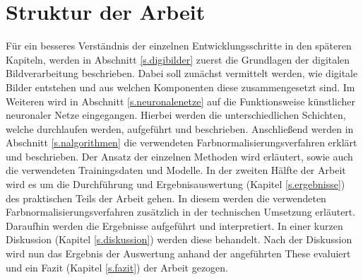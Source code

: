   \section{Struktur der Arbeit}\label{Struktur} 
Für ein besseres Verständnis der einzelnen Entwicklungsschritte in den späteren Kapiteln, werden in Abschnitt \ref{s.digibilder} zuerst die Grundlagen der digitalen Bildverarbeitung beschrieben. Dabei soll zunächst vermittelt werden, wie digitale Bilder entstehen und aus welchen Komponenten diese zusammengesetzt sind. Im Weiteren wird in Abschnitt \ref{s.neuronalenetze} auf die Funktionsweise künstlicher neuronaler Netze eingegangen. Hierbei werden die unterschiedlichen Schichten, welche durchlaufen werden, aufgeführt und beschrieben. Anschließend werden in Abschnitt \ref{s.nalgorithmen} die verwendeten Farbnormalisierungsverfahren erklärt und beschrieben. Der Ansatz der einzelnen Methoden wird erläutert, sowie auch die verwendeten Trainingsdaten und Modelle. In der zweiten Hälfte der Arbeit wird es um die Durchführung und Ergebnisauswertung (Kapitel \ref{s.ergebnisse}) des praktischen Teils der Arbeit gehen. In diesem werden die verwendeten Farbnormalisierungsverfahren zusätzlich in der technischen Umsetzung erläutert. Daraufhin werden die Ergebnisse aufgeführt und interpretiert. In einer kurzen Diskussion (Kapitel \ref{s.diskussion}) werden diese behandelt. Nach der Diskussion wird nun das Ergebnis der Auswertung anhand der angeführten These evaluiert und ein Fazit (Kapitel \ref{s.fazit}) der Arbeit gezogen.